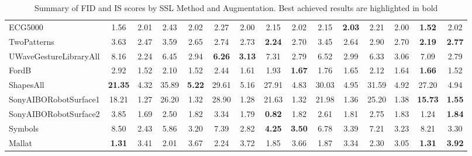 \documentclass[../../thesis.tex]{subfiles}
\begin{document}
\begin{table}[H]
\begin{adjustbox}{width=\textwidth}
\begin{tabular}{lcc|cc|cc|cc|cc|cc|cc}
        ECG5000                 & 1.56 & 2.01 & 2.43 & 2.02 & 2.27 & 2.00 & 2.15 & 2.02 & 2.15 & \textbf{2.03} & 2.21 & 2.00 & \textbf{1.52} & 2.02 \\
        TwoPatterns             & 3.63 & 2.47 & 3.59 & 2.65 & 2.74 & 2.73 & \textbf{2.24} & 2.70 & 3.45 & 2.64 & 2.90 & 2.70 & \textbf{2.19} & \textbf{2.77} \\
        UWaveGestureLibraryAll  & 8.16 & 2.24 & 6.45 & 2.94 & \textbf{6.26} & \textbf{3.13} & 7.31 & 2.79 & 6.52 & 2.99 & 6.33 & 3.06 & 7.09 & 2.79 \\
        FordB                   & 2.92 & 1.52 & 2.10 & 1.52 & 2.44 & 1.61 & 1.93 & \textbf{1.67} & 1.76 & 1.65  & 2.12 & 1.64 & \textbf{1.66} & 1.52 \\
        ShapesAll               & \textbf{21.35} & 4.32 & 35.89 & \textbf{5.22} & 29.61 & 5.16 & 27.91 & 4.83 & 30.03 & 4.95 & 31.59 & 4.92 & 27.20 & 4.94 \\
        SonyAIBORobotSurface1   & 18.21 & 1.27 & 26.20 & 1.32 & 28.90 & 1.28 & 21.63 & 1.32 & 21.98 & 1.36 & 25.20 & 1.38 & \textbf{15.73} & \textbf{1.55} \\
        SonyAIBORobotSurface2   & 3.85 & 1.69 & 2.50 & 1.82 & 3.34 & 1.79 & \textbf{0.82} & 1.82 & 2.61 & 1.81 & 2.75 & 1.83 & 1.24 & \textbf{1.84} \\
        Symbols                  & 8.50 & 2.43 & 5.86 & 3.20 & 7.39 & 2.82 & \textbf{4.25} & \textbf{3.50} & 6.78 & 3.39 & 7.21 & 3.23 & 8.21 & 3.30 \\
        Mallat                   & \textbf{1.31} & 3.41 & 2.01 & 3.67 & 2.24 & 3.72 & 1.85 & 3.66 & 1.87 & 3.34 & 2.30 & 3.05 & \textbf{1.31} & \textbf{3.92} \\
        \bottomrule
    \end{tabular}
    \end{adjustbox}
    \caption{Summary of FID and IS scores by SSL Method and Augmentation. Best achieved results are highlighted in bold}
\end{table}
\end{document}
